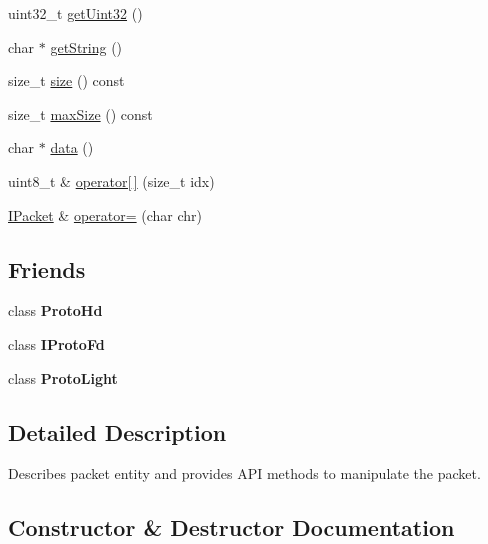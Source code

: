 \begin{DoxyCompactItemize}
uint32\+\_\+t \hyperlink{classTiny_1_1IPacket_a0a0d3758ca0f61e3eee9d20a7142de8d}{get\+Uint32} ()
\item 
char $\ast$ \hyperlink{classTiny_1_1IPacket_ac6e6a22ce9a652954491a8d4db081d79}{get\+String} ()
\item 
size\+\_\+t \hyperlink{classTiny_1_1IPacket_a76b6389f0d47b67c8428c58c2b09df51}{size} () const
\item 
size\+\_\+t \hyperlink{classTiny_1_1IPacket_a0a448d8efe2b6db3ee826f23b184b395}{max\+Size} () const
\item 
char $\ast$ \hyperlink{classTiny_1_1IPacket_aedf2ba31c5a29e3829458bd9f03a7051}{data} ()
\item 
uint8\+\_\+t \& \hyperlink{classTiny_1_1IPacket_aa1d796806e21d1c72a1fc12d2f6db592}{operator\mbox{[}$\,$\mbox{]}} (size\+\_\+t idx)
\item 
\hyperlink{classTiny_1_1IPacket}{I\+Packet} \& \hyperlink{classTiny_1_1IPacket_a215a30775140c2977b7064c91eada17e}{operator=} (char chr)
\end{DoxyCompactItemize}
\subsection*{Friends}
\begin{DoxyCompactItemize}
\item 
\mbox{\label{classTiny_1_1IPacket_a7f90e063a34c3417ed1ea25e64608857}} 
class {\bfseries Proto\+Hd}
\item 
\mbox{\label{classTiny_1_1IPacket_acb64e0550d8886dc8b8b5f1393667578}} 
class {\bfseries I\+Proto\+Fd}
\item 
\mbox{\label{classTiny_1_1IPacket_a1d317236f2a79fa559d5a9112e555882}} 
class {\bfseries Proto\+Light}
\end{DoxyCompactItemize}


\subsection{Detailed Description}
Describes packet entity and provides A\+PI methods to manipulate the packet. 

\subsection{Constructor \& Destructor Documentation}
\mbox{\label{classTiny_1_1IPacket_af44b18c4c8481475d40d8b87a6cb38ff}} 
